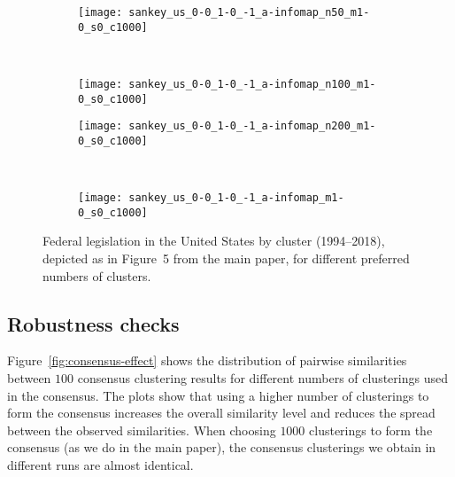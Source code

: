 \begin{figure}[H]
	\vspace*{-16pt}
	\centering
	\begin{subfigure}{0.45\linewidth}
		\texttt{[image: sankey\_us\_0-0\_1-0\_-1\_a-infomap\_n50\_m1-0\_s0\_c1000]}
	\end{subfigure}~%
	\begin{subfigure}{0.45\linewidth}
		\texttt{[image: sankey\_us\_0-0\_1-0\_-1\_a-infomap\_n100\_m1-0\_s0\_c1000]}
	\end{subfigure}

	\begin{subfigure}{0.45\linewidth}
		\texttt{[image: sankey\_us\_0-0\_1-0\_-1\_a-infomap\_n200\_m1-0\_s0\_c1000]}
	\end{subfigure}~%
	\begin{subfigure}{0.45\linewidth}
		\texttt{[image: sankey\_us\_0-0\_1-0\_-1\_a-infomap\_m1-0\_s0\_c1000]}
	\end{subfigure}
\caption{Federal legislation in the United States by cluster (1994--2018), depicted as in Figure~5 from the main paper, for different preferred numbers of clusters.}
\label{fig:sankey-preferred-variants}
\end{figure}

\newpage

\subsection{Robustness checks}

Figure~\ref{fig:consensus-effect} shows the distribution of pairwise similarities between $100$ consensus clustering results for different numbers of clusterings used in the consensus. 
The plots show that using a higher number of clusterings to form the consensus increases the overall similarity level and reduces the spread between the observed similarities. 
When choosing $1000$ clusterings to form the consensus (as we do in the main paper), 
the consensus clusterings we obtain in different runs are almost identical.

